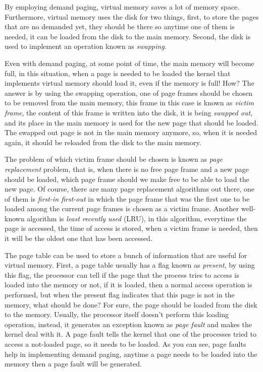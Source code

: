 By employing demand paging, virtual memory saves a lot of memory space.
Furthermore, virtual memory uses the disk for two things, first, to
store the pages that are no demanded yet, they should be there so
anytime one of them is needed, it can be loaded from the disk to the
main memory. Second, the disk is used to implement an operation known as
\emph{swapping}.

Even with demand paging, at some point of time, the main memory will
become full, in this situation, when a page is needed to be loaded the
kernel that implements virtual memory should load it, even if the memory
is full! How? The answer is by using the swapping operation, one of page
frames should be chosen to be removed from the main memory, this frame
in this case is known as \emph{victim frame}, the content of this frame
is written into the disk, it is being \emph{swapped out}, and its place
in the main memory is used for the new page that should be loaded. The
swapped out page is not in the main memory anymore, so, when it is
needed again, it should be reloaded from the disk to the main memory.

The problem of which victim frame should be chosen is known as
\emph{page replacement} problem, that is, when there is no free page
frame and a new page should be loaded, which page frame should we make
free to be able to load the new page. Of course, there are many page
replacement algorithms out there, one of them is \emph{first-in
first-out} in which the page frame that was the first one to be loaded
among the current page frames is chosen as a victim frame. Another
well-known algorithm is \emph{least recently used} (LRU), in this
algorithm, everytime the page is accessed, the time of access is stored,
when a victim frame is needed, then it will be the oldest one that has
been accessed.

The page table can be used to store a bunch of information that are
useful for virtual memory. First, a page table usually has a flag known
as \emph{present}, by using this flag, the processor can tell if the
page that the process tries to access is loaded into the memory or not,
if it is loaded, then a normal access operation is performed, but when
the present flag indicates that this page is not in the memory, what
should be done? For sure, the page should be loaded from the disk to the
memory. Usually, the processor itself doesn't perform this loading
operation, instead, it generates an exception known as \emph{page fault}
and makes the kernel deal with it. A page fault tells the kernel that
one of the processes tried to access a not-loaded page, so it needs to
be loaded. As you can see, page faults help in implementing demand
paging, anytime a page needs to be loaded into the memory then a page
fault will be generated.


